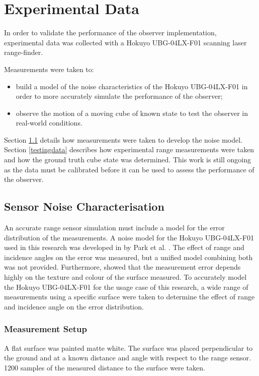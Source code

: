 \chapter{Experimental Data} \label{chap:experiment}
In order to validate the performance of the observer implementation, experimental data was collected with a Hokuyo UBG-04LX-F01 scanning laser range-finder.

Measurements were taken to:
\begin{itemize}
\item build a model of the noise characteristics of the Hokuyo UBG-04LX-F01 in order to more accurately simulate the performance of the observer;
\item observe the motion of a moving cube of known state to test the observer in real-world conditions.
\end{itemize}

Section \ref{sensor_noise} details how measurements were taken to develop the noise model.
Section \ref{testingdata} describes how experimental range measurements were taken and how the ground truth cube state was determined. This work is still ongoing as the data must be calibrated before it can be used to assess the performance of the observer. 

\section{Sensor Noise Characterisation} \label{sensor_noise}
An accurate range sensor simulation must include a model for the error distribution of the measurements. A noise model for the Hokuyo UBG-04LX-F01 used in this research was developed in by Park et al. \cite{park2010characterization}. The effect of range and incidence angles on the error was measured, but a unified model combining both was not provided. Furthermore, \cite{park2010characterization} showed that the measurement error depends highly on the texture and colour of the surface measured. To accurately model the Hokuyo UBG-04LX-F01 for the usage case of this research, a wide range of measurements using a specific surface were taken to determine the effect of range and incidence angle on the error distribution.

	\subsection{Measurement Setup}
	A flat surface was painted matte white. The surface was placed perpendicular to the ground and at a known distance and angle with respect to the range sensor.
	1200 samples of the measured distance to the surface were taken.
	
